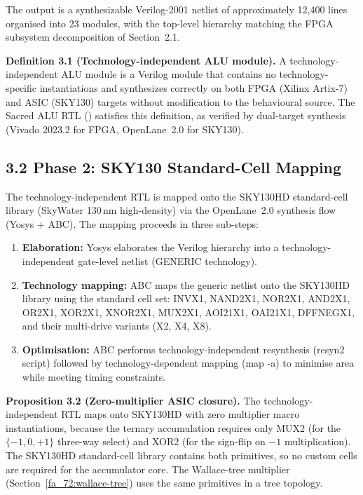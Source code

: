The output is a synthesizable Verilog-2001 netlist of approximately
12,400 lines organised into 23 modules, with the top-level hierarchy
matching the FPGA subsystem decomposition of Section~2.1.

\textbf{Definition 3.1 (Technology-independent ALU module).} A
technology-independent ALU module is a Verilog module that contains
no technology-specific instantiations and synthesizes correctly on
both FPGA (Xilinx Artix-7) and ASIC (SKY130) targets without
modification to the behavioural source. The Sacred ALU RTL
() satisfies this
definition, as verified by dual-target synthesis (Vivado 2023.2
for FPGA, OpenLane~2.0 for SKY130).

\subsection{3.2 Phase 2: SKY130 Standard-Cell Mapping}

The technology-independent RTL is mapped onto the SKY130HD standard-cell
library (SkyWater 130\,nm high-density) via the OpenLane~2.0 synthesis
flow (Yosys + ABC). The mapping proceeds in three sub-steps:

\begin{enumerate}
\tightlist
\item \textbf{Elaboration:} Yosys elaborates the Verilog hierarchy
      into a technology-independent gate-level netlist (GENERIC
      technology).
\item \textbf{Technology mapping:} ABC maps the generic netlist onto
      the SKY130HD library using the standard cell set: INVX1,
      NAND2X1, NOR2X1, AND2X1, OR2X1, XOR2X1, XNOR2X1, MUX2X1,
      AOI21X1, OAI21X1, DFFNEGX1, and their multi-drive variants
      (X2, X4, X8).
\item \textbf{Optimisation:} ABC performs technology-independent
      resynthesis (resyn2 script) followed by technology-dependent
      mapping (map -a) to minimise area while meeting timing
      constraints.
\end{enumerate}

\textbf{Proposition 3.2 (Zero-multiplier ASIC closure).} The
technology-independent RTL maps onto SKY130HD with zero multiplier
macro instantiations, because the ternary accumulation requires
only MUX2 (for the \(\{-1,0,+1\}\) three-way select) and XOR2
(for the sign-flip on \(-1\) multiplication). The SKY130HD
standard-cell library contains both primitives, so no custom cells
are required for the accumulator core. The Wallace-tree multiplier
(Section~\ref{fa_72:wallace-tree}) uses the same primitives in a
tree topology.

